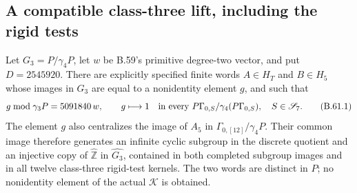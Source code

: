 \subsection*{A compatible class-three lift, including the rigid tests}

Let $G_3=P/\gamma_4P$, let $w$ be B.59's primitive
degree-two vector, and put $D=2545920$.
There are explicitly specified finite words
$A\in H_T$ and $B\in H_5$ whose images in $G_3$ are equal
to a nonidentity element $g$, and such that
\[
 g\bmod\gamma_3P=5091840\,w,
 \qquad
 g\longmapsto1\quad\hbox{in every }
 P\Gamma_{0,S}/\gamma_4(P\Gamma_{0,S}),\quad S\in\mathscr S_7.
                                                               \tag{B.61.1}
\]
The element $g$ also centralizes the image of $A_5$ in
$\Gamma_{0,[12]}/\gamma_4P$.
Their common image therefore generates an infinite cyclic
subgroup in the discrete quotient and an injective copy of
$\widehat{\mathbb Z}$ in $\widehat{G_3}$, contained in both
completed subgroup images and in all twelve class-three
rigid-test kernels.
The two words are distinct in $P$; no nonidentity element
of the actual $\mathcal K$ is obtained.

